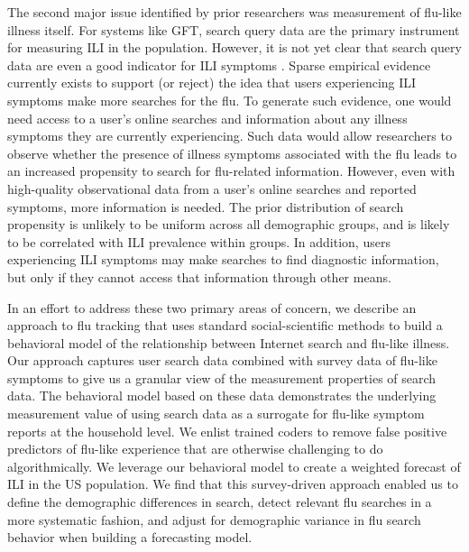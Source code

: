 \documentclass[fleqn,10pt]{wlscirep}
\begin{document}
The second major issue identified by prior researchers was measurement of flu-like illness itself. For systems like GFT, search query data are the primary instrument for measuring ILI in the population. However, it is not yet clear that search query data are even a good indicator for ILI symptoms \cite{lazer_etal_2014}. Sparse empirical evidence currently exists to support (or reject) the idea that users experiencing ILI symptoms make more searches for the flu. To generate such evidence, one would need access to a user's online searches and information about any illness symptoms they are currently experiencing. Such data would allow researchers to observe whether the presence of illness symptoms associated with the flu leads to an increased propensity to search for flu-related information. However, even with high-quality observational data from a user's online searches and reported symptoms, more information is needed. The prior distribution of search propensity is unlikely to be uniform across all demographic groups, and is likely to be correlated with ILI prevalence within groups. In addition, users experiencing ILI symptoms may make searches to find diagnostic information, but only if they cannot access that information through other means. 

In an effort to address these two primary areas of concern, we describe an approach to flu tracking that uses standard social-scientific methods to build a behavioral model of the relationship between Internet search and flu-like illness. Our approach captures user search data combined with survey data of flu-like symptoms to give us a granular view of the measurement properties of search data. The behavioral model based on these data demonstrates the underlying measurement value of using search data as a surrogate for flu-like symptom reports at the household level. We enlist trained coders to remove false positive predictors of flu-like experience that are otherwise challenging to do algorithmically. We leverage our behavioral model to create a weighted forecast of ILI in the US population. We find that this survey-driven approach enabled us to define the demographic differences in search, detect relevant flu searches in a more systematic fashion, and adjust for demographic variance in flu search behavior when building a forecasting model. 
\end{document}
